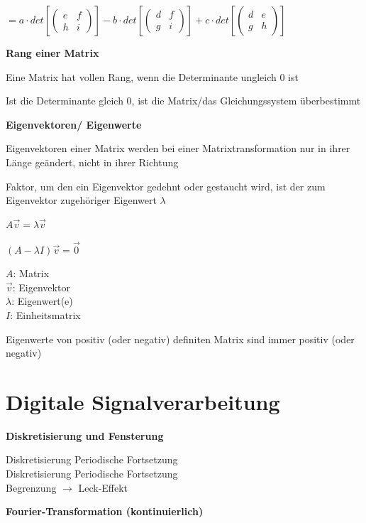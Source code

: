 $\displaystyle{
    = a \cdot det\left[ \begin{pmatrix}
        e & f\\
        h & i
        \end{pmatrix} \right]
    - b \cdot det\left[ \begin{pmatrix}
        d & f\\
        g & i
        \end{pmatrix} \right]
    + c \cdot det\left[ \begin{pmatrix}
        d & e\\
        g & h
        \end{pmatrix} \right]
}$

\textbf{Rang einer Matrix}

Eine Matrix hat vollen Rang, wenn die Determinante ungleich 0 ist

Ist die Determinante gleich 0, ist die Matrix/das Gleichungssystem überbestimmt

\textbf{Eigenvektoren/ Eigenwerte}

Eigenvektoren einer Matrix werden bei einer Matrixtransformation nur in ihrer Länge geändert,
nicht in ihrer Richtung

Faktor, um den ein Eigenvektor gedehnt oder gestaucht wird, ist der zum Eigenvektor zugehöriger
Eigenwert $\lambda$

$\displaystyle{
    A \vec{v} = \lambda \vec{v}
}$

$\displaystyle{
    (A - \lambda I) \vec{v} = \vec{0}
}$

$A$: Matrix\\
$\vec{v}$: Eigenvektor\\
$\lambda$: Eigenwert(e)\\
$I$: Einheitsmatrix

Eigenwerte von positiv (oder negativ) definiten Matrix sind immer positiv (oder negativ)


\section{Digitale Signalverarbeitung}

\textbf{Diskretisierung und Fensterung}

Diskretisierung \laplace \; Periodische Fortsetzung\\
Diskretisierung \Laplace \; Periodische Fortsetzung\\
Begrenzung $\rightarrow$ Leck-Effekt

\textbf{Fourier-Transformation (kontinuierlich)}

